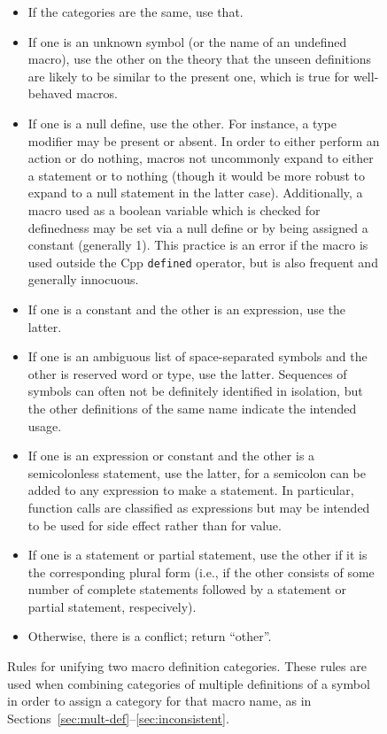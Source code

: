 \documentclass[10pt]{article}
\newcommand{\captionsmall}[1]{\caption[]{\small #1}}
\begin{document}
\begin{figure}
\small

\begin{itemize}\itemsep 0pt \parskip 0pt

\item If the categories are the same, use that.

\item If one is an unknown symbol (or the name of an undefined macro), use
  the other on the theory that the unseen definitions are likely to be
  similar to the present one, which is true for well-behaved macros.

\item If one is a null define, use the other.  For instance, a type
  modifier may be present or absent.  In order to either perform an action
  or do nothing, macros not uncommonly expand to either a statement or to
  nothing (though it would be more robust to expand to a null statement in
  the latter case).  Additionally, a macro used as a boolean variable which
  is checked for definedness may be set via a null define or by being
  assigned a constant (generally 1).  This practice is an error if the
  macro is used outside the Cpp {\tt defined} operator, but is also frequent
  and generally innocuous.

\item If one is a constant and the other is an expression, use the latter.

\item If one is an ambiguous list of space-separated symbols and the other
  is reserved word or type, use the latter.  Sequences of symbols can often
  not be definitely identified in isolation, but the other definitions of
  the same name indicate the intended usage.

\item If one is an expression or constant and the other is a semicolonless
  statement, use the latter, for a semicolon can be added to any expression
  to make a statement.  In particular, function calls are classified as
  expressions but may be intended to be used for side effect rather than
  for value.

\item
  If one is a statement or partial statement, use the other if it is the
  corresponding plural form (i.e., if the other consists of some number of
  complete statements followed by a statement or partial statement,
  respecively).  

\item Otherwise, there is a conflict; return ``other''.
\end{itemize}


\captionsmall{Rules for unifying two macro definition categories.  These
  rules are used when combining categories of multiple definitions of a
  symbol in order to assign a category for that macro name, as in
  Sections~\ref{sec:mult-def}--\ref{sec:inconsistent}.}
\label{fig:category-lub}
\end{figure}
\end{document}
